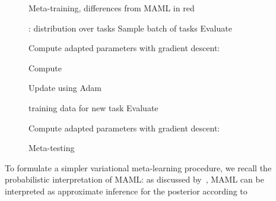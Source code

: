 \documentclass{article}
\begin{document}
\begin{figure*}[ttt!]
\begin{minipage}[t]{0.6\textwidth}
\begin{algorithm}[H]
    \caption{Meta-training, differences from MAML in red}
    \small
    \label{alg:promaml}
    \begin{algorithmic}[1]
    \Require : distribution over tasks
    \State {}
    \State Sample batch of tasks 
      \ForAll{}
     \State 
     \State {}
\State {}
\State Evaluate 
\State \begin{varwidth}[t]{\linewidth}
     Compute adapted parameters with gradient descent: \\
     
     \end{varwidth}
     \EndFor
\State {}
     \State \begin{varwidth}[t]{\linewidth} Compute \\ 
     
     \end{varwidth}
     \State Update  using Adam
    \EndWhile
\end{algorithmic}
\end{algorithm}
\end{minipage}
\begin{minipage}[t]{0.39\textwidth}
\vspace{1.5cm}
\begin{algorithm}[H]
    \caption{Meta-testing}
    \small
    \label{alg:promamltest}
    \begin{algorithmic}[1]
    \Require training data  for new task 
    \Require {}
    \State {}
     \State Evaluate 
     \State \begin{varwidth}[t]{\linewidth} Compute adapted parameters with gradient descent: \\ 
     \end{varwidth}
    \end{algorithmic}
\end{algorithm}
\end{minipage}
\vspace{-0.3cm}
\end{figure*} 
To formulate a simpler variational meta-learning procedure, we recall the probabilistic interpretation of MAML: as discussed by~\citet{grant2018recasting}, MAML can be interpreted as approximate inference for the posterior  according to
\end{document}
